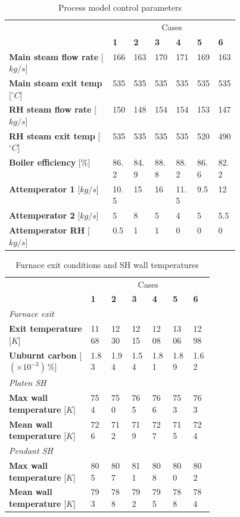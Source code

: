 \documentclass[review]{elsarticle}
\begin{document}
\begin{table}[h!]
\centering
\caption{Process model control parameters}
\label{fuel}
{\tabulinesep=1.2mm
\begin{tabularx}{\linewidth}{p{0.45\linewidth} XXXXXX}
\hline
&\multicolumn{6}{c}{Cases}\\
 & \textbf{1} & \textbf{2} & \textbf{3}& \textbf{4}&\textbf{5}&\textbf{6}\\
\hline
\textbf{Main steam flow rate} 	[$kg/s$]		&166&163&170	&171&169&163\\
\textbf{Main steam exit temp} 	[$^{\circ}C$]	&535&535&535	&535&535&535\\
\textbf{RH steam flow rate} 	[$kg/s$]		&150&148&154	&154&153&147\\
\textbf{RH steam exit temp} 	[$^{\circ}C$]	&535&535&535	&535&520&490\\
\textbf{Boiler efficiency} 		[$\%$]			&86.2&84.9&88.8	&88.2&86.6&82.2\\
\textbf{Attemperator 1} 		[$kg/s$]			&10.5&15&16		&11.5&9.5&12\\
\textbf{Attemperator 2} 		[$kg/s$]			&5&8&5			&4&5&5.5\\
\textbf{Attemperator RH} 		[$kg/s$]			&0.5&1&1		&0&0&0\\
\hline
\end{tabularx}}
\end{table}

\begin{table}[h!]
\centering
\caption{Furnace exit conditions and SH wall temperatures}
\label{fuel}
{\tabulinesep=1.2mm
\begin{tabularx}{\linewidth}{p{0.4\linewidth} XXXXXX}
\hline
&\multicolumn{6}{c}{Cases}\\
 & \textbf{1} & \textbf{2} & \textbf{3}& \textbf{4}&\textbf{5}&\textbf{6}\\
\hline
\multicolumn{7}{l}{\textit{Furnace exit}}\\
\textbf{Exit temperature} [$K$] & 1168 & 1230 & 1215 & 1208 & 1306 & 1298\\
\textbf{Unburnt carbon} [$(\times 10^{-3})\,\%$] & 1.83 & 1.94 & 1.54 & 1.81 & 1.89 & 1.62\\
\multicolumn{7}{l}{\textit{Platen SH}}\\
\textbf{Max wall temperature} [$K$]  &754 & 750 & 765 & 766 & 753 & 763\\
\textbf{Mean wall temperature} [$K$] &726 & 712 & 719 & 727 & 715 & 724\\
\multicolumn{7}{l}{\textit{Pendant SH}}\\
\textbf{Max wall temperature} [$K$]  & 805 & 807 & 811 & 808 & 800 & 802\\
\textbf{Mean wall temperature} [$K$] & 793 & 788 & 792 & 795 & 788 & 784\\
\hline
\end{tabularx}}
\end{table}
\end{document}
